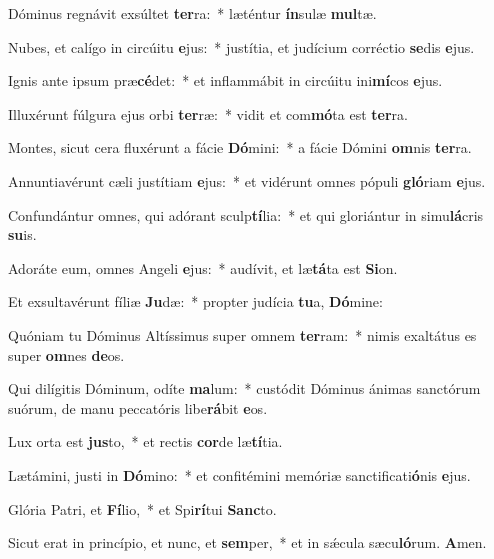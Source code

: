 \item Dóminus regnávit exsúltet \textbf{ter}ra:~* læténtur \textbf{ín}sulæ \textbf{mul}tæ.
\item Nubes, et calígo in circúitu \textbf{e}jus:~* justítia, et judícium corréctio \textbf{se}dis \textbf{e}jus.
\item Ignis ante ipsum præ\textbf{cé}det:~* et inflammábit in circúitu ini\textbf{mí}cos \textbf{e}jus.
\item Illuxérunt fúlgura ejus orbi \textbf{ter}ræ:~* vidit et com\textbf{mó}ta est \textbf{ter}ra.
\item Montes, sicut cera fluxérunt a fácie \textbf{Dó}mini:~* a fácie Dómini \textbf{om}nis \textbf{ter}ra.
\item Annuntiavérunt cæli justítiam \textbf{e}jus:~* et vidérunt omnes pópuli \textbf{gló}riam \textbf{e}jus.
\item Confundántur omnes, qui adórant sculp\textbf{tí}lia:~* et qui gloriántur in simu\textbf{lá}cris \textbf{su}is.
\item Adoráte eum, omnes Angeli \textbf{e}jus:~* audívit, et læ\textbf{tá}ta est \textbf{Si}on.
\item Et exsultavérunt fíliæ \textbf{Ju}dæ:~* propter judícia \textbf{tu}a, \textbf{Dó}mine:
\item Quóniam tu Dóminus Altíssimus super omnem \textbf{ter}ram:~* nimis exaltátus es super \textbf{om}nes \textbf{de}os.
\item Qui dilígitis Dóminum, odíte \textbf{ma}lum:~* custódit Dóminus ánimas sanctórum suórum, de manu peccatóris libe\textbf{rá}bit \textbf{e}os.
\item Lux orta est \textbf{jus}to,~* et rectis \textbf{cor}de læ\textbf{tí}tia.
\item Lætámini, justi in \textbf{Dó}mino:~* et confitémini memóriæ sanctificati\textbf{ó}nis \textbf{e}jus.
\item Glória Patri, et \textbf{Fí}lio,~* et Spi\textbf{rí}tui \textbf{Sanc}to.
\item Sicut erat in princípio, et nunc, et \textbf{sem}per,~* et in sǽcula sæcu\textbf{ló}rum. \textbf{A}men.
